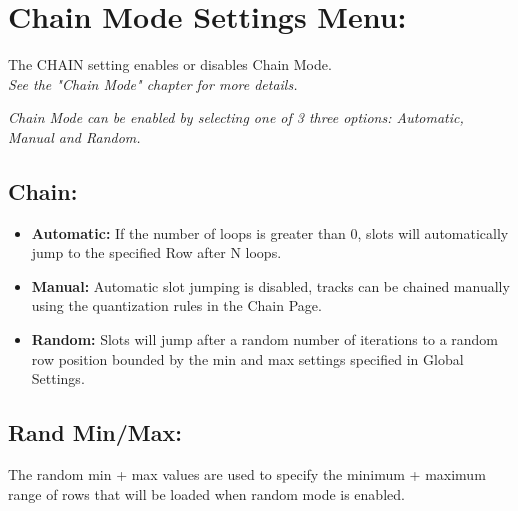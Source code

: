 \chapter{Chain Mode Settings Menu:}
The CHAIN setting enables or disables Chain Mode.\\\textit{See the "Chain Mode" chapter for more details.}


\textit{Chain Mode can be enabled by selecting one of 3 three options: Automatic, Manual and Random.}
\\
\section{Chain:}
\begin{itemize}
\item \textbf{Automatic:} If the number of loops is greater than 0, slots will automatically jump to the specified Row after N loops.
\item \textbf{Manual:} Automatic slot jumping is disabled, tracks can be chained manually using the quantization rules in the Chain Page.
\item \textbf{Random:} Slots will jump after a random number of iterations to a random row position bounded by the min and max settings specified in Global Settings.
\end{itemize}
\section{Rand Min/Max:} The random min + max values are used to specify the minimum + maximum range of rows that will be loaded when random mode is enabled.
